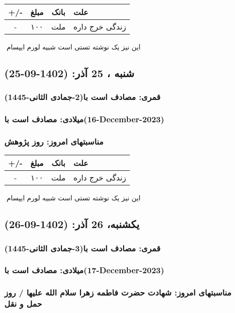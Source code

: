 \documentclass{article}
\newcommand{\rnote}[1]{\marginpar{\textcolor{color}{\StrSubstitute{\##1}{ }{\_}}}}
\newcommand{\myRow}[4]{
    #1 & #2 & #3 & #4 \\ \hline
}
\begin{document}
\begin{tabular}{ | c | c | c | p{5cm} |}
    \hline
    \myRow{ +/- }{مبلغ}{بانک}{علت}
    \myRow{-}{۱۰۰}{ملت}{زندگی خرج داره}
\end{tabular}
\newline
\newline

‌
\rnote{تست}
این نیز یک نوشته تستی است شبیه لورم ایپسام




\newpage
{}
\textcolor{color}{
\section{ شنبه ، 25 آذر: (1402-09-25) }
\subsubsection*{قمری: مصادف است با(2-جمادی الثانی-1445)} 
\subsubsection*{میلادی: مصادف است با(16-December-2023)}
\subsubsection*{مناسبتهای امروز: روز پژوهش}
}


\begin{tabular}{ | c | c | c | p{5cm} |}
    \hline
    \myRow{ +/- }{مبلغ}{بانک}{علت}
    \myRow{-}{۱۰۰}{ملت}{زندگی خرج داره}
\end{tabular}
\newline
\newline

‌
\rnote{تست}
این نیز یک نوشته تستی است شبیه لورم ایپسام




\newpage
{}
\textcolor{color}{
\section{ یکشنبه، 26 آذر: (1402-09-26) }
\subsubsection*{قمری: مصادف است با(3-جمادی الثانی-1445)} 
\subsubsection*{میلادی: مصادف است با(17-December-2023)}
\subsubsection*{مناسبتهای امروز: شهادت حضرت فاطمه زهرا سلام الله علیها / روز حمل و نقل}
}
\end{document}
